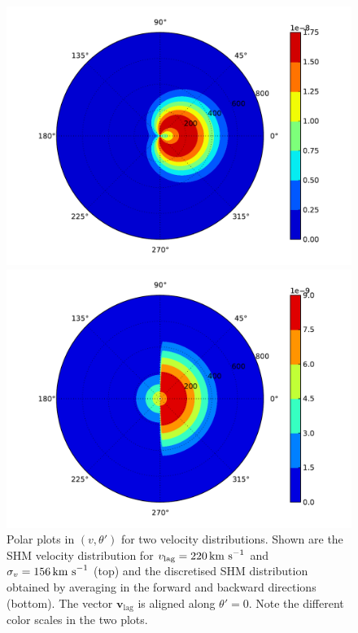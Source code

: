 \begin{figure}[t]
\label{fig:directional:fN2}
  \centering
  \includegraphics[width=1\textwidth]{Directional/SHMpolar.pdf}

  \includegraphics[width=1\textwidth]{Directional/SHMpolarN2.pdf}

\caption[Discretised velocity distribution for $N=2$ components]{Polar plots in $(v,\theta')$ for two velocity distributions. Shown are the SHM velocity distribution for $v_\textrm{lag} = 220 \,\textrm{km s}^{-1}$ and $\sigma_v = 156 \,\textrm{km s}^{-1}$ (top) and the discretised SHM distribution obtained by averaging in the forward and backward directions (bottom). The vector $\textbf{v}_\textrm{lag}$ is aligned along $\theta' = 0$. Note the different color scales in the two plots.}
\end{figure}


